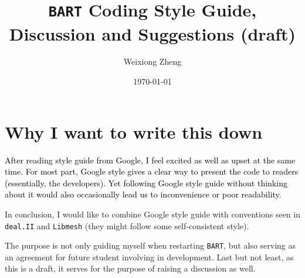 \documentclass{article}
\title{{\tt BART} Coding Style Guide, Discussion and Suggestions (draft)} %
\author{Weixiong Zheng} %
\date{\today} %
\begin{document}
\maketitle %
\section{Why I want to write this down}
\textcolor{black}{After reading style guide from Google, I feel excited as well as upset at the same time. For most part, Google style gives a clear way to present the code to readers (essentially, the developers). Yet following Google style guide without thinking about it would also occasionally lead us to inconvenience or poor readability}.

In conclusion, I would like to combine Google style guide with conventions seen in {\tt deal.II} and {\tt Libmesh} (they might follow some self-consistent style).

The purpose is not only guiding myself when restarting {\tt BART}, but also serving as an agreement for future student involving in development. Last but not least, as this is a draft, it serves for the purpose of raising a discussion as well.
\end{document}
